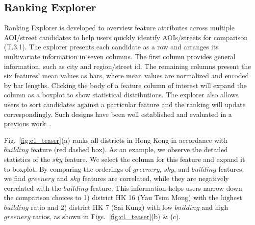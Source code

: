 \subsection{Ranking Explorer}
Ranking Explorer is developed to overview feature attributes across multiple AOI/street candidates to help users quickly identify AOIs/streets for comparison (T.3.1).
The explorer presents each candidate as a row and arranges its multivariate information in seven columns.
The first column provides general information, such as city and region/street id. 
The remaining columns present the six features' mean values as bars, where mean values are normalized and encoded by bar lengths.
Clicking the body of a feature column of interest will expand the column as a boxplot to show statistical distributions.
The explorer also allows users to sort candidates against a particular feature and the ranking will update correspondingly.
Such designs have been well established and evaluated in a previous work~\cite{liu2016smartadp}.

Fig.~\ref{fig:c1_teaser}(a) ranks all districts in Hong Kong in accordance with $building$ feature (red dashed box).
As an example, we observe the detailed statistics of the $sky$ feature.
We select the column for this feature and expand it to boxplot. 
By comparing the orderings of $greenery$, $sky$, and $building$ features, we find $greenery$ and $sky$ features are correlated, while they are negatively correlated with the $building$ feature.
This information helps users narrow down the comparison choices to 1) district HK 16 (Yau Tsim Mong) with the highest $building$ ratio and 2) district HK 7 (Sai Kung) with low $building$ and high $greenery$ ratios, as shown in Figs.~\ref{fig:c1_teaser}(b) \& (c).

